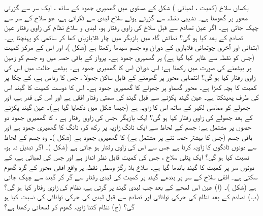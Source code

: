 یکساں سلاخ (کمیت ،  لمبائی  ) شکل  کے مستوی میں  گھمیری جمود کے ساتھ ، ایک سر سے گزرتی محور پر گھومتا ہے۔ نشیبی نقطہ سے گزرتے ہوئے سلاخ  لبدی سے ٹکراتی ہے، جو سلاخ کے سر سے چپک جاتی ہے۔ اگر  عین تصادم سے قبل سلاخ کی زاوی رفتار  ہو، لبدی و سلاخ نظام کی زاوی  رفتار عین تصادم کے بعد کیا ہو گی؟
نمائش   گاہ  میں بازیگر  میں   چار قلابازیاں  کھا کر ساتھی  کو پہنچتا ہے۔ ابتدائی اور آخری  چوتھائی قلابازی  کے دوران وہ جسم سیدھا رکھتا ہے  (شکل )، اور اس کے مرکز کمیت (جس کو نقطہ سے ظاہر کیا گیا ہے)  پر گھمیری جمود  ہے۔ پرواز کے باقی حصہ میں  وہ جسم  کو  زمین پر بیٹھنے کی صورت میں رکھتا ہے؛ اس دوران اس کا گھمیری جمود  ہے۔ بیٹھے حالت میں اس کی زاوی رفتار  کیا ہو گی؟
انتصابی محور پر گھومنے کے قابل   ساکن جھولا ، جس کا رداس  ہے، کے چکا پر  کمیت کا بچہ  کھڑا ہے۔ محور گھماو پر جھولے کا گھمیری جمود  ہے۔ اس کا دوست   کمیت کا گیند  اس کی طرف پھینکتا ہے۔ عین گیند پکڑنے  سے قبل گیند کی سمتی رفتار   افقی ہے   اور اس کی قدر  ہے، اور جھولے کو مماسی لکیر کے ساتھ اس کا زاویہ  ہے (جیسا شکل  میں دکھایا گیا ہے)۔ عین گیند پکڑنے کے بعد جھولے کی زاوی رفتار کیا ہو گی؟
ایک   بازیگر  ،جس کی زاوی رفتار  ہے ، کا گھمیری جمود دو حصوں پر مشتمل ہے: جسم کے لحاظ سے  ایک   ٹانگ  زاویہ پر رکھ کر، ٹانگ کا گھمیری جمود   ہے  اور باقی جسم (جس کا بیشتر حصہ تنے پر مشتمل ہے) کا
 گھمیری جمود  ہے (شکل )۔ وہ  جسم کے لحاظ سے دونوں  ٹانگوں کا زاویہ   کرتا ہے جس سے  اس کی زاوی رفتار  ہو جاتی ہے (شکل )۔ اگر  تبدیل نہ ہو، نسبت  کیا ہو گی؟
ایک پتلی سلاخ ، جس کی کمیت قابل نظر انداز ہے اور جس کی لمبائی  ہے، کے  دونوں سر پر   کمیت کا گیند  باندھا گیا ہے۔ سلاخ بلا رگڑ وسطی   نقطہ پر واقع  افقی محور کے گرد گھوم سکتی ہے۔ افقی سلاخ کے   سر پر  بندھے گیند پر   کمیت  کی لبدی  رفتار سے  گر کر گیند سے چپک جاتی ہے (شکل )۔ (ا)  عین اس  لمحے کے بعد  جب لبدی  گیند پر گرتی ہے، نظام کی زاوی رفتار کیا ہو گی؟ (ب) تصادم کے بعد  نظام کی حرکی توانائی اور  تصادم سے قبل لبدی کی حرکی توانائی کی نسبت کیا ہو گی؟ (ج)  نظام کتنا زاویہ گھوم کر لمحاتی رکھتا ہے؟
